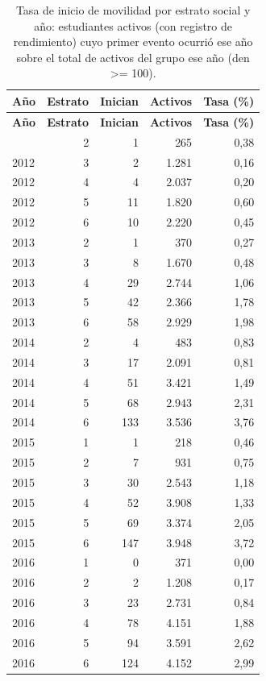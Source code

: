 \begin{longtable}{lrrrr}
\caption{Tasa de inicio de movilidad por estrato social y año: estudiantes activos (con registro de rendimiento) cuyo primer evento ocurrió ese año sobre el total de activos del grupo ese año (den >= 100).}\label{tab:hist-tasa-estrato}\\
\toprule
\textbf{Año} & \textbf{Estrato} & \textbf{Inician} & \textbf{Activos} & \textbf{Tasa (\%)} \\
\midrule
\endfirsthead
\toprule \textbf{Año} & \textbf{Estrato} & \textbf{Inician} & \textbf{Activos} & \textbf{Tasa (\%)} \\
\midrule
\endhead
\bottomrule
\endfoot
2012 & 2 & 1 & 265 & 0,38 \\
2012 & 3 & 2 & 1.281 & 0,16 \\
2012 & 4 & 4 & 2.037 & 0,20 \\
2012 & 5 & 11 & 1.820 & 0,60 \\
2012 & 6 & 10 & 2.220 & 0,45 \\
2013 & 2 & 1 & 370 & 0,27 \\
2013 & 3 & 8 & 1.670 & 0,48 \\
2013 & 4 & 29 & 2.744 & 1,06 \\
2013 & 5 & 42 & 2.366 & 1,78 \\
2013 & 6 & 58 & 2.929 & 1,98 \\
2014 & 2 & 4 & 483 & 0,83 \\
2014 & 3 & 17 & 2.091 & 0,81 \\
2014 & 4 & 51 & 3.421 & 1,49 \\
2014 & 5 & 68 & 2.943 & 2,31 \\
2014 & 6 & 133 & 3.536 & 3,76 \\
2015 & 1 & 1 & 218 & 0,46 \\
2015 & 2 & 7 & 931 & 0,75 \\
2015 & 3 & 30 & 2.543 & 1,18 \\
2015 & 4 & 52 & 3.908 & 1,33 \\
2015 & 5 & 69 & 3.374 & 2,05 \\
2015 & 6 & 147 & 3.948 & 3,72 \\
2016 & 1 & 0 & 371 & 0,00 \\
2016 & 2 & 2 & 1.208 & 0,17 \\
2016 & 3 & 23 & 2.731 & 0,84 \\
2016 & 4 & 78 & 4.151 & 1,88 \\
2016 & 5 & 94 & 3.591 & 2,62 \\
2016 & 6 & 124 & 4.152 & 2,99 \\

\end{longtable}
